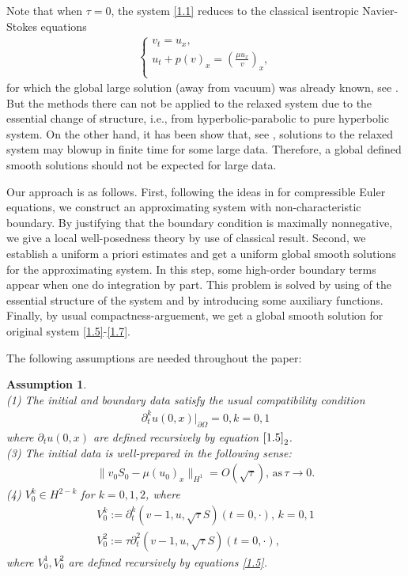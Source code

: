 \documentclass[10pt,reqno]{amsart}
\numberwithin{equation}{section}
\newtheorem{assumption}[theorem]{Assumption}
\begin{document}
Note that when $\tau=0$, the system \eqref{1.1}  reduces to the classical isentropic Navier-Stokes equations
\begin{align}\label{CNS}
\begin{cases}
v_t=u_x,\\
u_t+p(v)_x=\left(\frac{\mu u_x}{v}\right)_x,\\
\end{cases}
\end{align}
 for which the global large solution (away from vacuum) was  already known, see \cite{Kanel1968}.
 But the methods there can not be applied to the relaxed system due to the essential change of structure, i.e., from hyperbolic-parabolic to pure hyperbolic system. On the other hand, it has been show that, see \cite{HW2019, BJ2022},
 solutions to the relaxed system may blowup in finite time for some large data. Therefore, a global defined  smooth solutions should  not be expected for large data.

Our approach is as follows. First, following the ideas in \cite{SCH86} for compressible Euler equations, we construct an approximating system with non-characteristic boundary.  By justifying that the boundary condition is maximally nonnegative, we give a local well-posedness theory by use of classical result. Second, we establish a uniform a priori estimates and get a uniform global smooth solutions for the approximating system. In this step,  some high-order boundary terms  appear when one do integration by part. This problem is solved   by using of the essential structure of the system and by introducing some auxiliary functions. Finally, by usual compactness-arguement, we get a global smooth solution for original system \eqref{1.5}-\eqref{1.7}.

The following assumptions are needed throughout the paper:
\begin{assumption}\label{assu}
\mbox{}\\
 (1) The initial and boundary data satisfy the usual compatibility condition
\begin{align}\label{comp}
	\partial^k_tu(0,x)\big|_{\partial\Omega}=0,
	k=0,1
\end{align}
where $\partial_tu(0,x)$  are defined recursively by equation $\eqref{1.5}_2$. \\
(3) The initial data is well-prepared in the following sense:
\begin{align}\label{new-hu4-1}
 \| v_0S_0-\mu (u_0)_x \|_{H^1} =O(\sqrt{\tau}),\, \mathrm{as}\, \tau \rightarrow 0.
\end{align}
(4) $V_0^k \in H^{2-k} $ for $k=0, 1, 2$, where 
\begin{align*}
V_0^k:= \partial_t^k\left(v-1, u , \sqrt{\tau} S\right)(t=0, \cdot), \, k=0, 1\\
V_0^2:= \tau \partial_t^2 (v-1, u,  \sqrt{\tau} S)(t=0, \cdot),
\end{align*}
where $V_0^1, V_0^2$ are defined recursively by equations \eqref{1.5}. 
\end{assumption}
\end{document}
